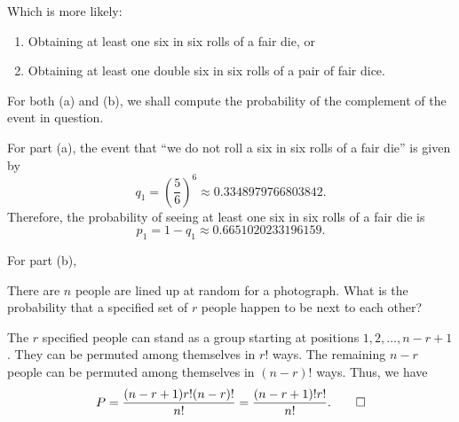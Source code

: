 \begin{problem}[Handout 1, \# 12]
  Which is more likely:
  \begin{enumerate}[label=(\alph*),noitemsep]
  \item Obtaining at least one six in six rolls of a fair die, or
  \item Obtaining at least one double six in six rolls of a pair of fair
    dice.
  \end{enumerate}
\end{problem}
\begin{solution*}
  For both (a) and (b), we shall compute the probability of the complement
  of the event in question.

  For part (a), the event that ``we do not roll a six in six rolls of a
  fair die'' is given by
  \[
    q_1=\left(\frac{5}{6}\right)^6\approx\num{0.3348979766803842}.
  \]
  Therefore, the probability of seeing at least one six in six rolls of a
  fair die is
  \begin{equation}
    \label{eq:1:six-in-six-rolls}
    p_1=1-q_1\approx\num{0.6651020233196159}.
  \end{equation}

  For part (b),
\end{solution*}

\begin{problem}[Handout 1, \# 13]
  There are \(n\) people are lined up at random for a photograph. What is
  the probability that a specified set of \(r\) people happen to be next to
  each other?
\end{problem}
\begin{solution*}
  The \(r\) specified people can stand as a group starting at positions
  \(1,2,\dotsc,n-r+1\). They can be permuted among themselves in \(r!\)
  ways. The remaining \(n-r\) people can be permuted among themselves in
  \((n-r)!\) ways. Thus, we have
  \[
    P=\frac{(n-r+1)r!(n-r)!}{n!}=\frac{(n-r+1)!r!}{n!}.\qedhere
  \]
\end{solution*}

